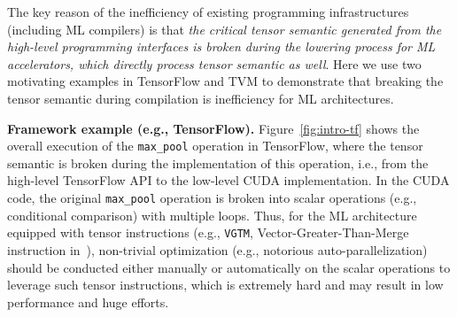 \documentclass[pageno]{jpaper}
\begin{document}
The key reason of the inefficiency of existing programming infrastructures (including ML compilers) is that \emph{the critical tensor semantic generated from the high-level programming interfaces is broken during the lowering process for ML accelerators, which directly process tensor semantic as well}. Here we use two motivating examples in TensorFlow and TVM to demonstrate that breaking the tensor semantic during compilation is inefficiency for ML architectures.



\textbf{Framework example (e.g., TensorFlow).} Figure~\ref{fig:intro-tf} shows the overall execution of the \texttt{max\_pool} operation in TensorFlow, where the tensor semantic is broken during the implementation of this operation, i.e., from the high-level TensorFlow API to the low-level CUDA implementation. In the CUDA code, the original \texttt{max\_pool} operation is broken into scalar operations (e.g., conditional comparison) with multiple loops. Thus, for the ML architecture equipped with tensor instructions (e.g., \texttt{VGTM}, Vector-Greater-Than-Merge instruction in~\cite{liu2016cambricon,chen2019instruction}), non-trivial optimization (e.g., notorious auto-parallelization) should be conducted either manually or automatically on the scalar operations to leverage such tensor instructions, which is extremely hard and may result in low performance and huge efforts.


\end{document}
